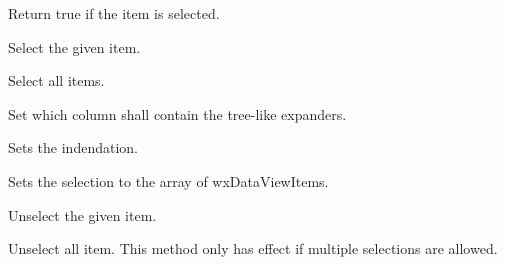 Return true if the item is selected.

\label{wxdataviewctrlselect}


Select the given item.

\label{wxdataviewctrlselectall}


Select all items.

\label{wxdataviewctrlsetexpandercolumn}


Set which column shall contain the tree-like expanders.

\label{wxdataviewctrlsetindent}


Sets the indendation.

\label{wxdataviewctrlsetselections}


Sets the selection to the array of wxDataViewItems.

\label{wxdataviewctrlunselect}


Unselect the given item.

\label{wxdataviewctrlunselectall}


Unselect all item. This method only has effect if multiple
selections are allowed.

